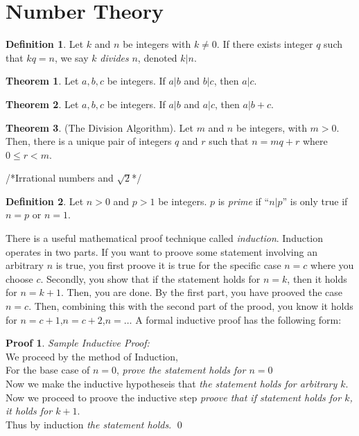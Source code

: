 \documentclass[11pt]{article}
\theoremstyle{definition}
\newtheorem{theorem}{Theorem}[section]
\newtheorem*{proof*}{Proof}
\newtheorem{definition}{Definition}[section]
\begin{document}
\section{Number Theory}
\begin{definition}
    Let $k$ and $n$ be integers with $k \neq 0$. If there exists integer $q$ such that $kq=n$, we say $k$ \emph{divides} $n$, denoted $k \vert n$.
\end{definition}
\begin{theorem}
    Let $a,b,c$ be integers. If $a \vert b$ and $b \vert c$, then $a \vert c$.
\end{theorem}
\begin{theorem}
    Let $a,b,c$ be integers. If $a \vert b$ and $a \vert c$, then $a \vert b+c$.
\end{theorem}
\begin{theorem}
    (The Division Algorithm). Let $m$ and $n$ be integers, with $m>0$. Then, there is a unique pair of integers $q$ and $r$ such that $n = mq+r$ where $0 \leq r < m$. 
\end{theorem}
/*Irrational numbers and $\sqrt{2}$*/
\begin{definition}
    Let $n > 0$ and $p > 1$ be integers. $p$ is \emph{prime} if ``$n\vert p$'' is only true if $n=p$ or $n=1$.
\end{definition}
There is a useful mathematical proof technique called \emph{induction}. Induction operates in two parts. If you want to proove some statement involving an arbitrary $n$ is true, you first proove it is true for the specific case $n=c$ where you choose $c$. Secondly, you show that if the statement holds for $n=k$, then it holds for $n=k+1$. Then, you are done. By the first part, you have prooved the case $n=c$. Then, combining this with the second part of the prood, you know it holds for $n=c+1$,$n=c+2$,$n=\dots$ A formal inductive proof has the following form:
\begin{proof*}
    \emph{Sample Inductive Proof:} \\
    We proceed by the method of Induction, \\
    For the base case of $n=0$, \emph{prove the statement holds for $n=0$} \\
    Now we make the inductive hypotheseis that \emph{the statement holds for arbitrary $k$}. \\
    Now we proceed to proove the inductive step \emph{proove that if statement holds for $k$, it holds for $k+1$}. \\
    Thus by induction \emph{the statement holds}. \qed
\end{proof*}
\end{document}
